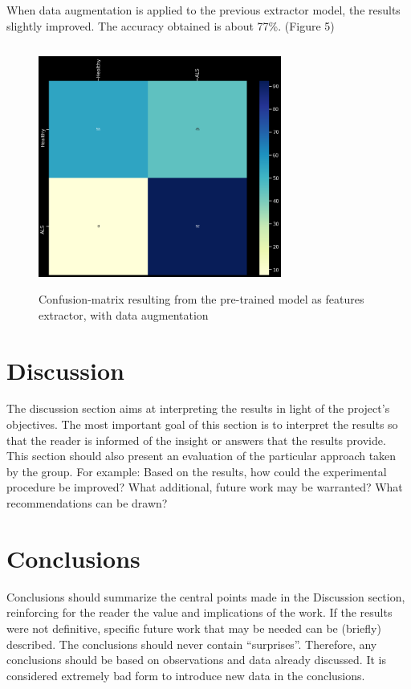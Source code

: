 When data augmentation is applied to the previous extractor model, the results slightly improved. The accuracy obtained is about 77\%. (Figure 5)
\begin{figure}[H]
\centering
\caption{Confusion-matrix resulting from the pre-trained model as features extractor, with data augmentation}
\includegraphics[width=8cm, height=8cm]{extractor_data_augmentation_model_results}
\end{figure}


\section{Discussion}
The discussion section aims at interpreting the results in light of the project's objectives. The most important goal of this section is to interpret the results so that the reader is informed of the insight or answers that the results provide. This section should also present an evaluation of the particular approach taken by the group. For example: Based on the results, how could the experimental procedure be improved? What additional, future work may be warranted? What recommendations can be drawn?


\section{Conclusions}
Conclusions should summarize the central points made in the Discussion section, reinforcing for the reader the value and implications of the work. If the results were not definitive, specific future work that may be needed can be (briefly) described. The conclusions should never contain ``surprises''. Therefore, any conclusions should be based on observations and data already discussed. It is considered extremely bad form to introduce new data in the conclusions.

